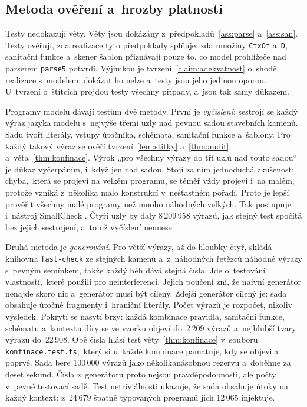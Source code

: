 \subsection{Metoda ověření a~hrozby platnosti}
\label{sec:model-overeni}

Testy nedokazují věty. Věty jsou dokázány z~předpokladů~\ref{ass:parse} a~\ref{ass:san}. Testy ověřují, zda realizace tyto předpoklady splňuje: zda množiny \texttt{CtxOf} a~\texttt{D}, sanitační funkce a~skener šablon přiznávají pouze to, co model prohlížeče nad parserem \texttt{parse5} potvrdí. Výjimkou je tvrzení~\ref{claim:adekvatnost} o~shodě realizace s~modelem: dokázat ho nelze a~testy jsou jeho jedinou oporou. U~tvrzení o~štítcích projdou testy všechny případy, a~jsou tak samy důkazem.

Programy modelu dávají testům dvě metody. První je \emph{vyčíslení}: sestrojí se každý výraz jazyka modelu s~nejvýše třemi uzly nad pevnou sadou stavebních kamenů. Sadu tvoří literály, vstupy útočníka, schémata, sanitační funkce a~šablony. Pro každý takový výraz se ověří tvrzení~\ref{lem:stitky} a~\ref{thm:audit} a~věta~\ref{thm:konfinace}. Výrok „pro všechny výrazy do tří uzlů nad touto sadou“ je důkaz vyčerpáním, i~když jen nad sadou. Stojí za ním jednoduchá zkušenost: chyba,~která se projeví na velkém programu, se téměř vždy projeví i~na malém, protože vzniká z~několika málo konstrukcí v~nešťastném pořadí. Proto je lepší prověřit všechny malé programy než mnoho náhodných velkých. Tak postupuje i~nástroj SmallCheck \parencite{runciman2008smallcheck}. Čtyři uzly by daly 8\,209\,958 výrazů, jak stejný test spočítá bez jejich sestrojení, a~to už vyčíslení neunese.

Druhá metoda je \emph{generování}. Pro větší výrazy, až do hloubky čtyř, skládá knihovna \texttt{fast-check} ze stejných kamenů a~z~náhodných řetězců náhodné výrazy s~pevným semínkem, takže každý běh dává stejná čísla. Jde o~testování vlastností,~které \textcite{hritcu2013testing} použili pro neinterferenci. Jejich poučení zní, že naivní generátor nenajde skoro nic a~generátor musí být cílený. Zdejší generátor cílený je: sada obsahuje útočné fragmenty i~hraniční literály. Počet výrazů je rozpočet, nikoliv výsledek. Pokrytí se nasytí brzy: každá kombinace pravidla, sanitační funkce, schématu a~kontextu díry se ve vzorku objeví do~2\,209 výrazů a~nejhlubší tvary výrazů do~22\,908. Obě čísla hlásí test věty~\ref{thm:konfinace} v~souboru \texttt{konfinace.test.ts},~který si u~každé kombinace pamatuje, kdy se objevila poprvé. Sada bere 100\,000 výrazů jako několikanásobnou rezervu a~doběhne za deset sekund. Čísla z~generátoru proto nejsou pravděpodobnosti, ale počty v~pevné testovací sadě. Test netriviálnosti ukazuje, že sada obsahuje útoky na každý kontext: z~24\,679 špatně typovaných programů jich 12\,065 injektuje.

